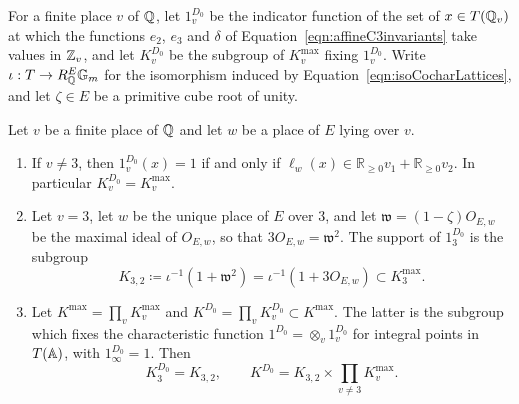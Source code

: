 \begin{proposition}

\label{prop:localIntegrality}


\leanok

For a finite place $v$ of $\QQ$, let $1_v^{D_0}$ be the indicator function of the set of $x\in T(\QQ_v)$ at which the functions $e_2$, $e_3$ and $\delta$ of Equation~\ref{eqn:affineC3invariants} take values in $\ZZ_v$, and let $K_v^{D_0}$ be the subgroup of $K_v^{\mathrm{max}}$ fixing $1_v^{D_0}$. Write $\iota:T\to R^E_\QQ\GG_m$ for the isomorphism induced by Equation~\ref{eqn:isoCocharLattices}, and let $\zeta\in E$ be a primitive cube root of unity.

 Let $v$ be a finite place of $\QQ$ and let $w$ be a place of $E$ lying over $v$. \begin{enumerate} \item If $v \neq 3$, then $1_v^{D_0}(x) = 1$ if and only if $\ell_w(x) \in \mathbb R_{\geq 0}v_1+\mathbb R_{\geq 0}v_2$. In particular $K_v^{D_0}=K_v^{\mathrm{max}}$. \item Let $v = 3$, let $w$ be the unique place of $E$ over $3$, and let $\mathfrak w = (1-\zeta)O_{E,w}$ be the maximal ideal of $O_{E,w}$, so that $3O_{E,w} = \mathfrak w^2$. The support of $1_3^{D_0}$ is the subgroup \begin{equation*} K_{3,2}\coloneqq\iota^{-1}(1+\mathfrak w^2) =\iota^{-1}(1+3O_{E,w})\subset K_3^{\mathrm{max}}. \end{equation*} \item Let $K^{\mathrm{max}}=\prod_v K_v^{\mathrm{max}}$ and $K^{D_0}=\prod_v K_v^{D_0}\subset K^{\mathrm{max}}$. The latter is the subgroup which fixes the characteristic function $1^{D_0}=\otimes_v1_v^{D_0}$ for integral points in $T(\AA)$, with $1_\infty^{D_0}=1$. Then \[ K_3^{D_0}=K_{3,2},\qquad K^{D_0}=K_{3,2}\times\prod_{v\neq3}K_v^{\mathrm{max}}. \] \end{enumerate} 

\end{proposition}

